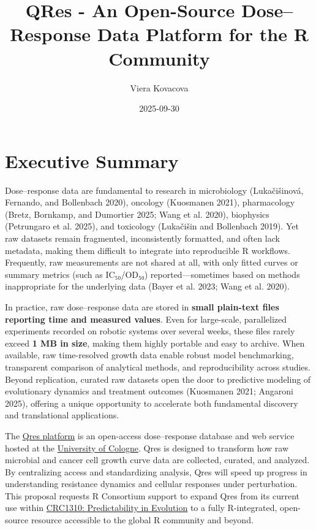 \documentclass[
  letterpaper,
  DIV=11,
  numbers=noendperiod]{scrartcl}
\title{QRes - An Open-Source Dose--Response Data Platform for the R
Community}
\author{Viera Kovacova}
\date{2025-09-30}
\begin{document}
\maketitle


\section{Executive Summary}\label{executive-summary}

Dose--response data are fundamental to research in microbiology
(Lukačišinová, Fernando, and Bollenbach 2020), oncology (Kuosmanen
2021), pharmacology (Bretz, Bornkamp, and Dumortier 2025; Wang et al.
2020), biophysics (Petrungaro et al. 2025), and toxicology (Lukačišin
and Bollenbach 2019). Yet raw datasets remain fragmented, inconsistently
formatted, and often lack metadata, making them difficult to integrate
into reproducible R workflows. Frequently, raw measurements are not
shared at all, with only fitted curves or summary metrics (such as
IC₅₀/OD₅₀) reported---sometimes based on methods inappropriate for the
underlying data (Bayer et al. 2023; Wang et al. 2020).

In practice, raw dose--response data are stored in \textbf{small
plain-text files reporting time and measured values}. Even for
large-scale, parallelized experiments recorded on robotic systems over
several weeks, these files rarely exceed \textbf{1 MB in size}, making
them highly portable and easy to archive. When available, raw
time-resolved growth data enable robust model benchmarking, transparent
comparison of analytical methods, and reproducibility across studies.
Beyond replication, curated raw datasets open the door to predictive
modeling of evolutionary dynamics and treatment outcomes (Kuosmanen
2021; Angaroni 2025), offering a unique opportunity to accelerate both
fundamental discovery and translational applications.

The \href{https://growthcurvedb.shinyapps.io/growthcurvedb/}{Qres
platform} is an open-access dose--response database and web service
hosted at the \href{https://crc1310.uni-koeln.de/}{University of
Cologne}. Qres is designed to transform how raw microbial and cancer
cell growth curve data are collected, curated, and analyzed. By
centralizing access and standardizing analysis, Qres will speed up
progress in understanding resistance dynamics and cellular responses
under perturbation. This proposal requests R Consortium support to
expand Qres from its current use within
\href{https://crc1310.uni-koeln.de/}{CRC1310: Predictability in
Evolution} to a fully R-integrated, open-source resource accessible to
the global R community and beyond.
\end{document}
